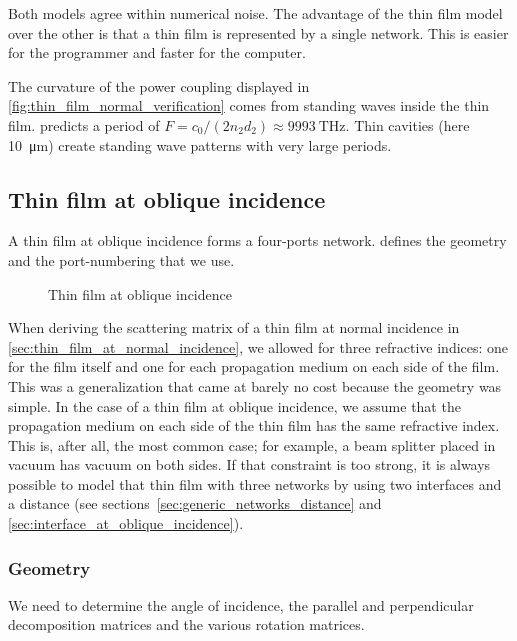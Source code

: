 Both models agree within numerical noise.
The advantage of the thin film model over the other is that a thin film is represented by a single network.
This is easier for the programmer and faster for the computer.

The curvature of the power coupling displayed in \cref{fig:thin_film_normal_verification} comes from standing waves inside the thin film.
 predicts a period of $F = c_0 / (2 n_2 d_2) \approx \SI{9993}{\tera\hertz}$.
Thin cavities (here \SI{10}{\micro\meter}) create standing wave patterns with very large periods.



\subsection{Thin film at oblique incidence}
\label{sec:thin_film_at_oblique_incidence}

A thin film at oblique incidence forms a four-ports network.
 defines the geometry and the port-numbering that we use.
\begin{figure}[hbtp]
    \centering
    \caption{Thin film at oblique incidence}
    \label{fig:thin_film_oblique}
\end{figure}

When deriving the scattering matrix of a thin film at normal incidence in \cref{sec:thin_film_at_normal_incidence}, we allowed for three refractive indices: one for the film itself and one for each propagation medium on each side of the film.
This was a generalization that came at barely no cost because the geometry was simple.
In the case of a thin film at oblique incidence, we assume that the propagation medium on each side of the thin film has the same refractive index.
This is, after all, the most common case;
for example, a beam splitter placed in vacuum has vacuum on both sides.
If that constraint is too strong, it is always possible to model that thin film with three networks by using two interfaces and a distance (see sections~\ref{sec:generic_networks_distance} and \ref{sec:interface_at_oblique_incidence}).

\subsubsection{Geometry}
\label{sec:thin_film_geometry}
We need to determine the angle of incidence, the parallel and perpendicular decomposition matrices and the various rotation matrices.

